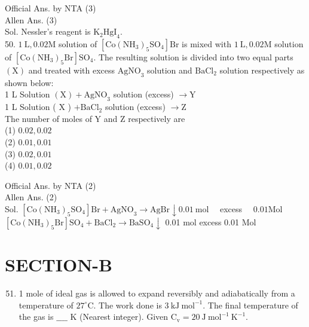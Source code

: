 \documentclass[10pt]{article}
\begin{document}
Official Ans. by NTA (3)\\
Allen Ans. (3)\\
Sol. Nessler's reagent is \(\mathrm{K}_{2} \mathrm{HgI}_{4}\).\\
50. \(1 \mathrm{~L}, 0.02 \mathrm{M}\) solution of \(\left[\mathrm{Co}\left(\mathrm{NH}_{3}\right)_{5} \mathrm{SO}_{4}\right] \mathrm{Br}\) is mixed with \(1 \mathrm{~L}, 0.02 \mathrm{M}\) solution of \(\left[\mathrm{Co}\left(\mathrm{NH}_{3}\right)_{5} \mathrm{Br}\right] \mathrm{SO}_{4}\). The resulting solution is divided into two equal parts \((\mathrm{X})\) and treated with excess \(\mathrm{AgNO}_{3}\) solution and \(\mathrm{BaCl}_{2}\) solution respectively as shown below:\\
1 L Solution \((\mathrm{X})+\mathrm{AgNO}_{3}\) solution (excess) \(\rightarrow \mathrm{Y}\)\\
1 L Solution ( X ) \(+\mathrm{BaCl}_{2}\) solution (excess) \(\rightarrow \mathrm{Z}\)\\
The number of moles of Y and Z respectively are\\
(1) \(0.02,0.02\)\\
(2) \(0.01,0.01\)\\
(3) \(0.02,0.01\)\\
(4) \(0.01,0.02\)

Official Ans. by NTA (2)\\
Allen Ans. (2)\\
Sol. \(\left[\mathrm{Co}\left(\mathrm{NH}_{3}\right)_{5} \mathrm{SO}_{4}\right] \mathrm{Br}+\mathrm{AgNO}_{3} \rightarrow \mathrm{AgBr} \downarrow 0.01 \mathrm{~mol} \quad\) excess \(\quad 0.01 \mathrm{Mol}\)\\
\(\left[\mathrm{Co}\left(\mathrm{NH}_{3}\right)_{5} \mathrm{Br}\right] \mathrm{SO}_{4}+\mathrm{BaCl}_{2} \rightarrow \mathrm{BaSO}_{4} \downarrow\) 0.01 mol excess 0.01 Mol

\section*{SECTION-B}
\begin{enumerate}
  \setcounter{enumi}{50}
  \item 1 mole of ideal gas is allowed to expand reversibly and adiabatically from a temperature of \(27^{\circ} \mathrm{C}\). The work done is \(3 \mathrm{~kJ} \mathrm{~mol}^{-1}\). The final temperature of the gas is \(\_\_\_\_\) K (Nearest integer). Given \(\mathrm{C}_{\mathrm{v}}=20 \mathrm{~J} \mathrm{~mol}^{-1} \mathrm{~K}^{-1}\).
\end{enumerate}
\end{document}
